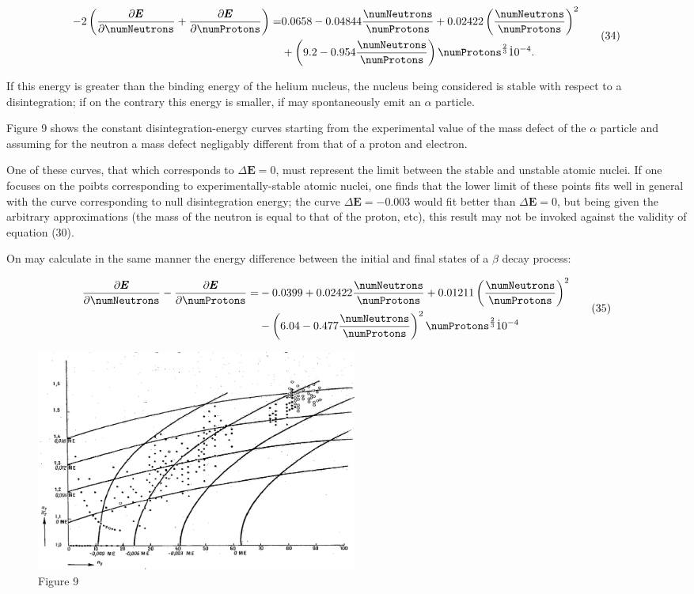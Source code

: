 \documentclass{article}
\newcommand{\var}[1]{\pmb{#1}}
\newcommand{\pdXdY}[2]{
\frac{\partial {#1}}{\partial {#2}}
}
\newcommand{\E}{\var{E}}
\newcommand{\nequ}[2]{
\begin{equation*}
#1
\tag{#2}
\end{equation*}
}
\begin{document}
\nequ{
\begin{split}
-2\left( \pdXdY{\E}{\numNeutrons} + \pdXdY{\E}{\numProtons} \right) = & 0.0658 - 
0.04844\frac{\numNeutrons}{\numProtons} + 0.02422\left( \frac{\numNeutrons}{\numProtons} \right)^2 \\
& + \left(9.2 - 0.954\frac{\numNeutrons}{\numProtons}\right)\numProtons^{\frac{2}{3}}\dot 10^{-4}.
\end{split}
}{34}

If this energy is greater than the binding energy of the helium nucleus, the nucleus being considered is stable with respect to a disintegration; if on the contrary this energy is smaller, if may spontaneously emit an $\alpha$ particle.

Figure 9 shows the constant disintegration-energy curves starting from the experimental value of the mass defect of the $\alpha$ particle and assuming for the neutron a mass defect negligably different from that of a proton and electron.

One of these curves, that which corresponds to $\Delta\E = 0$, must represent the limit between the stable and unstable atomic nuclei. If one focuses on the poibts corresponding to experimentally-stable atomic nuclei, one finds that the lower limit of these points fits well in general with the curve corresponding to null disintegration energy; the curve $\Delta\E = -0.003$ would fit better than $\Delta\E = 0$, but being given the arbitrary approximations (the mass of the neutron is equal to that of the proton, etc), this result may not be invoked against the validity of equation (30).

On may calculate in the same manner the energy difference between the initial and final states of a $\beta$ decay process:

\nequ{
\begin{split}
\pdXdY{\E}{\numNeutrons} - \pdXdY{\E}{\numProtons} = &-0.0399 + 0.02422\frac{\numNeutrons}{\numProtons} + 0.01211\left( \frac{\numNeutrons}{\numProtons} \right)^2 \\
& -\left( 6.04 - 0.477\frac{\numNeutrons}{\numProtons}\right)^2 \numProtons^{\frac{2}{3}}\dot 10^{-4}
\end{split}
}{35}

\begin{figure}[h!]
\centering
\includegraphics[width=300pt]{images/fig9}
{\caption*{Figure 9}}
\end{figure}
\end{document}
